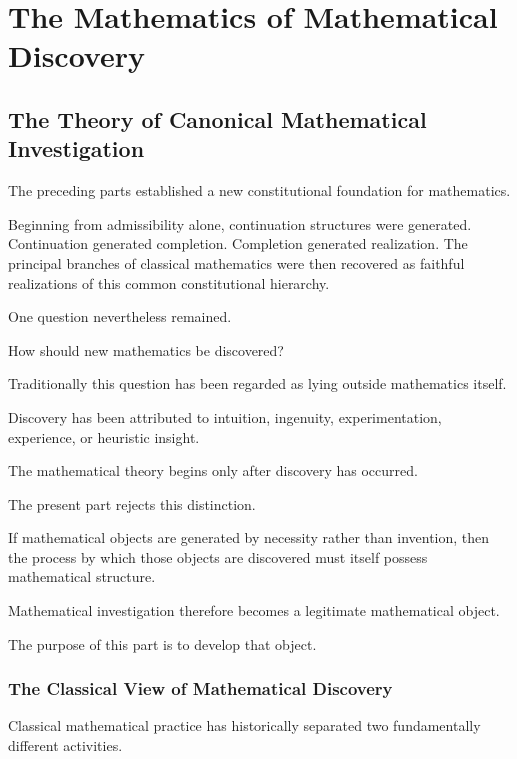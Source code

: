 \documentclass[13pt,openany]{book}
\theoremstyle{plain}
\theoremstyle{definition}
\begin{document}
\part{The Mathematics of Mathematical Discovery}

\chapter{The Theory of Canonical Mathematical Investigation}

The preceding parts established a new constitutional foundation for
mathematics.

Beginning from admissibility alone, continuation structures were generated.
Continuation generated completion.
Completion generated realization.
The principal branches of classical mathematics were then recovered as faithful
realizations of this common constitutional hierarchy.

One question nevertheless remained.

How should new mathematics be discovered?

Traditionally this question has been regarded as lying outside mathematics
itself.

Discovery has been attributed to intuition, ingenuity, experimentation,
experience, or heuristic insight.

The mathematical theory begins only after discovery has occurred.

The present part rejects this distinction.

If mathematical objects are generated by necessity rather than invention, then
the process by which those objects are discovered must itself possess
mathematical structure.

Mathematical investigation therefore becomes a legitimate mathematical object.

The purpose of this part is to develop that object.

\section{The Classical View of Mathematical Discovery}

Classical mathematical practice has historically separated two fundamentally
different activities.
\end{document}
